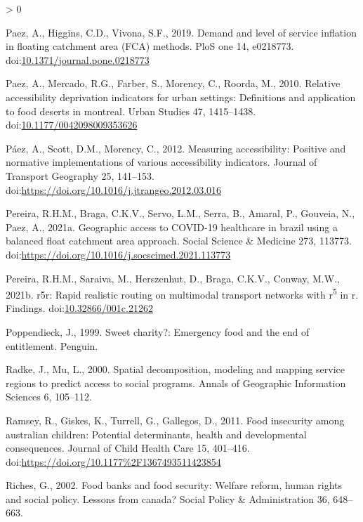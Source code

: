 \documentclass[]{elsarticle} %
\newlength{\cslhangindent}
\newenvironment{CSLReferences}[2] %
 {%
  \setlength{\parindent}{0pt}
  \ifodd #1 \everypar{\setlength{\hangindent}{\cslhangindent}}\ignorespaces\fi
  \ifnum #2 > 0
  \setlength{\parskip}{#2\baselineskip}
  \fi
 }%
 {}
\begin{document}
\begin{CSLReferences}{1}{0}
\leavevmode\hypertarget{ref-paez2019demand}{}%
Paez, A., Higgins, C.D., Vivona, S.F., 2019. Demand and level of service
inflation in floating catchment area (FCA) methods. PloS one 14,
e0218773.
doi:\href{https://doi.org/10.1371/journal.pone.0218773}{10.1371/journal.pone.0218773}

\leavevmode\hypertarget{ref-paez2010relative}{}%
Paez, A., Mercado, R.G., Farber, S., Morency, C., Roorda, M., 2010.
Relative accessibility deprivation indicators for urban settings:
Definitions and application to food deserts in montreal. Urban Studies
47, 1415--1438.
doi:\href{https://doi.org/10.1177/0042098009353626}{10.1177/0042098009353626}

\leavevmode\hypertarget{ref-paez2012measuring}{}%
Páez, A., Scott, D.M., Morency, C., 2012. Measuring accessibility:
Positive and normative implementations of various accessibility
indicators. Journal of Transport Geography 25, 141--153.
doi:\url{https://doi.org/10.1016/j.jtrangeo.2012.03.016}

\leavevmode\hypertarget{ref-pereira2021geographic}{}%
Pereira, R.H.M., Braga, C.K.V., Servo, L.M., Serra, B., Amaral, P.,
Gouveia, N., Paez, A., 2021a. Geographic access to COVID-19 healthcare
in brazil using a balanced float catchment area approach. Social Science
\& Medicine 273, 113773.
doi:\url{https://doi.org/10.1016/j.socscimed.2021.113773}

\leavevmode\hypertarget{ref-pereira2021r5r}{}%
Pereira, R.H.M., Saraiva, M., Herszenhut, D., Braga, C.K.V., Conway,
M.W., 2021b. r5r: Rapid realistic routing on multimodal transport
networks with r\textsuperscript{5} in r. Findings.
doi:\href{https://doi.org/10.32866/001c.21262}{10.32866/001c.21262}

\leavevmode\hypertarget{ref-poppendieck1999sweet}{}%
Poppendieck, J., 1999. Sweet charity?: Emergency food and the end of
entitlement. Penguin.

\leavevmode\hypertarget{ref-radke2000spatial}{}%
Radke, J., Mu, L., 2000. Spatial decomposition, modeling and mapping
service regions to predict access to social programs. Annals of
Geographic Information Sciences 6, 105--112.

\leavevmode\hypertarget{ref-ramsey2011food}{}%
Ramsey, R., Giskes, K., Turrell, G., Gallegos, D., 2011. Food insecurity
among australian children: Potential determinants, health and
developmental consequences. Journal of Child Health Care 15, 401--416.
doi:\url{https://doi.org/10.1177\%2F1367493511423854}

\leavevmode\hypertarget{ref-riches2002food}{}%
Riches, G., 2002. Food banks and food security: Welfare reform, human
rights and social policy. Lessons from canada? Social Policy \&
Administration 36, 648--663.


\end{CSLReferences}
\end{document}
